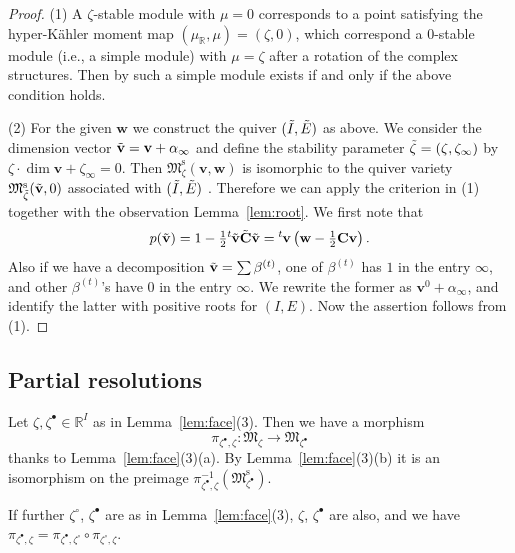 \documentclass[pdftex]{sigma}
\theoremstyle{definition}
\numberwithin{equation}{section}
\newcommand{\lemref}[1]{Lemma~\ref{#1}}
\newcommand{\lsp}[2]{{\mskip-.3mu}{}^{#1}\mskip-1mu{#2}}
\newcommand{\R}{{\mathbb R}}
\newcommand{\M}{{\mathfrak M}} %
\newcommand{\Mreg}{\M^{\operatorname{s}}}
\newcommand{\bv}{{\mathbf v}} %
\newcommand{\bw}{{\mathbf w}} %
\newcommand{\bC}{{\mathbf C}} %
\begin{document}
\begin{proof}
(1) A $\zeta$-stable module with $\mu = 0$ corresponds to a point
satisfying the hyper-K\"ahler moment map $(\mu_\R,\mu) = (\zeta,0)$,
which correspond a $0$-stable module (i.e., a simple module) with $\mu
= \zeta$ after a rotation of the complex structures. Then by
\cite[Theorem~1.2]{CB} such a simple module exists if and only if the
above condition holds.

(2) For the given $\bw$ we construct the quiver $(\Tilde{I},\Tilde{E})$ as
above. We consider the dimension vector $\Tilde{\bv} = \bv + \alpha_\infty$
and def\/ine the stability parameter $\Tilde{\zeta} = (\zeta,\zeta_\infty)$ by
\(
\zeta\cdot \dim \bv + \zeta_\infty = 0.
\)
Then $\Mreg_\zeta(\bv,\bw)$ is isomorphic to the quiver variety
$\Mreg_{\Tilde{\zeta}}(\Tilde{\bv},0)$ associated with
$(\Tilde{I},\Tilde{E})$ \cite[the end of Introduction]{CB}.
%
Therefore we can apply the criterion in (1) together with the
observation \lemref{lem:root}. We f\/irst note that
\[
  p(\Tilde{\bv}) = 1 - \tfrac12 \lsp{t}{\Tilde{\bv}} \Tilde{\bC} \Tilde{\bv}
  = \lsp{t}{\bv}\left(\bw - \tfrac12 \bC \bv\right).
\]
Also if we have a decomposition $\Tilde{\bv} = \sum \beta^{(t)}$, one
of $\beta^{(t)}$ has $1$ in the entry $\infty$, and other
$\beta^{(t)}$'s have $0$ in the entry $\infty$. We rewrite the former
as $\bv^0 + \alpha_\infty$, and identify the latter with positive
roots for $(I,E)$. Now the assertion follows from (1).
\end{proof}

\subsection{Partial resolutions}\label{subsec:partial}

Let $\zeta,\zeta^\bullet\in\R^I$ as in \lemref{lem:face}(3). Then we have a
morphism
\begin{equation*}
   \pi_{\zeta^\bullet,\zeta} \colon \M_\zeta \to \M_{\zeta^\bullet}
\end{equation*}
thanks to \lemref{lem:face}(3)(a). By \lemref{lem:face}(3)(b) it is an
isomorphism on the preimage $\pi_{\zeta^\bullet,\zeta}^{-1}(\Mreg_{\zeta^\bullet})$.

If further $\zeta^\circ$, $\zeta^\bullet$ are as in \lemref{lem:face}(3),
$\zeta$, $\zeta^\bullet$ are also, and we have
\(
  \pi_{\zeta^\bullet,\zeta} = \pi_{\zeta^\bullet,\zeta^\circ}
  \circ \pi_{\zeta^\circ,\zeta}.
\)
\end{document}
